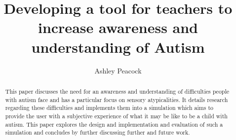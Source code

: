 \documentclass[11pt]{report}
\begin{document}
\title{Developing a tool for teachers to increase awareness and understanding of Autism}
\author{Ashley Peacock}
\maketitle

\begin{abstract}
This paper discusses the need for an awareness and understanding of difficulties people with autism face and has a particular focus on sensory atypicalities. It details research regarding these difficulties and implements them into a simulation which aims to provide the user with a subjective experience of what it may be like to be a child with autism. This paper explores the design and implementation and evaluation of such a simulation and concludes by further discussing further and future work.
\end{abstract}
\end{document}
